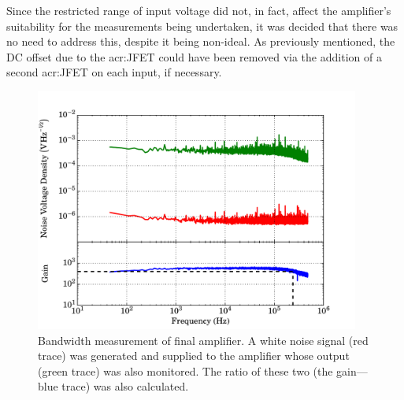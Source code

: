 \par 
Since the restricted range of input voltage did not, in fact, affect the amplifier's suitability for the measurements being undertaken, it was decided that there was no need to address this, despite it being non-ideal. As previously mentioned, the DC offset due to the \gls{acr:JFET} could have been removed via the addition of a second \gls{acr:JFET} on each input, if necessary.
\begin{figure}[tb]
\begin{center}
\includegraphics[width = 0.95\textwidth]{figures/final_amp_BW}
\caption[Bandwidth measurement of final amplifier]{Bandwidth measurement of final amplifier. A white noise signal (red trace) was generated and supplied to the amplifier whose output (green trace) was also monitored. The ratio of these two (the gain---blue trace) was also calculated.}
\label{fig:finalAmp_BW}
\end{center}
\end{figure}
\par 
